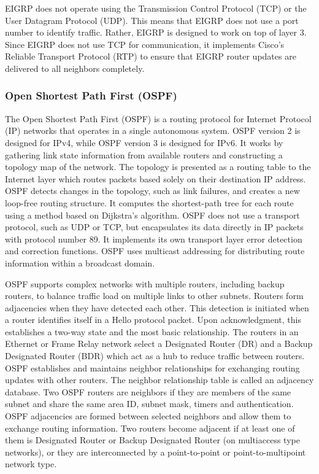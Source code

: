 EIGRP does not operate using the Transmission Control Protocol (TCP) or the User Datagram Protocol (UDP). This means that EIGRP does not use a port number to identify traffic. Rather, EIGRP is designed to work on top of layer 3. Since EIGRP does not use TCP for communication, it implements Cisco's Reliable Transport Protocol (RTP) to ensure that EIGRP router updates are delivered to all neighbors completely.

\subsubsection*{Open Shortest Path First (OSPF)\cite{OSPFv2}\cite{OSPFIPv6}}
The Open Shortest Path First (OSPF) is a routing protocol for Internet Protocol (IP) networks that operates in a single autonomous system. OSPF version 2 is designed for IPv4, while OSPF version 3 is designed for IPv6. It works by gathering link state information from available routers and constructing a topology map of the network. The topology is presented as a routing table to the Internet layer which routes packets based solely on their destination IP address. OSPF detects changes in the topology, such as link failures, and creates a new loop-free routing structure. It computes the shortest-path tree for each route using a method based on Dijkstra's algorithm. OSPF does not use a transport protocol, such as UDP or TCP, but encapsulates its data directly in IP packets with protocol number 89. It implements its own transport layer error detection and correction functions. OSPF uses multicast addressing for distributing route information within a broadcast domain.

OSPF supports complex networks with multiple routers, including backup routers, to balance traffic load on multiple links to other subnets. Routers form adjacencies when they have detected each other. This detection is initiated when a router identifies itself in a Hello protocol packet. Upon acknowledgment, this establishes a two-way state and the most basic relationship. The routers in an Ethernet or Frame Relay network select a Designated Router (DR) and a Backup Designated Router (BDR) which act as a hub to reduce traffic between routers. OSPF establishes and maintains neighbor relationships for exchanging routing updates with other routers. The neighbor relationship table is called an adjacency database. Two OSPF routers are neighbors if they are members of the same subnet and share the same area ID, subnet mask, timers and authentication. OSPF adjacencies are formed between selected neighbors and allow them to exchange routing information. Two routers become adjacent if at least one of them is Designated Router or Backup Designated Router (on multiaccess type networks), or they are interconnected by a point-to-point or point-to-multipoint network type.

